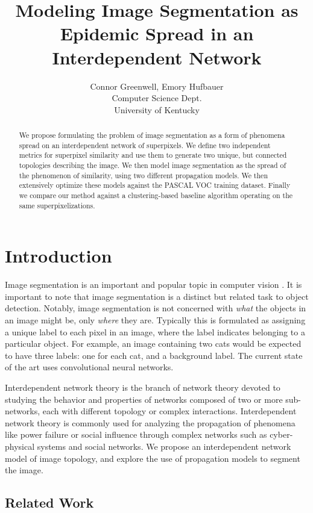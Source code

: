 \documentclass[twocolumn]{article}
\title{Modeling Image Segmentation as Epidemic Spread in an Interdependent Network}
\author{
  Connor Greenwell, Emory Hufbauer\\
  Computer Science Dept. \\
  University of Kentucky
}
\date{}
\newcommand{\seclab}[1]{\label{sec:#1}}
\begin{document}
\maketitle

\begin{abstract}
We propose formulating the problem of image segmentation as a form of phenomena spread on an interdependent network of superpixels. We define two independent metrics for superpixel similarity and use them to generate two unique, but connected topologies describing the image. We then model image segmentation as the spread of the phenomenon of similarity, using two different propagation models. We then extensively optimize these models against the PASCAL VOC training dataset. Finally we compare our method against a clustering-based baseline algorithm operating on the same superpixelizations.
\end{abstract}

\section{Introduction}

Image segmentation is an important and popular topic in computer vision \cite{newell2017associative, li2017fully, ren2017end}. It is important to note that image segmentation is a distinct but related task to object detection. Notably, image segmentation is not concerned with \emph{what} the objects in an image might be, only \emph{where} they are. Typically this is formulated as assigning a unique label to each pixel in an image, where the label indicates belonging to a particular object. For example, an image containing two cats would be expected to have three labels: one for each cat, and a background label. The current state of the art uses convolutional neural networks.

Interdependent network theory is the branch of network theory devoted to studying the behavior and properties of networks composed of two or more sub-networks, each with different topology or complex interactions. Interdependent network theory is commonly used for analyzing the propagation of phenomena like power failure or social influence through complex networks such as cyber-physical systems and social networks. We propose an interdependent network model of image topology, and explore the use of propagation models to segment the image. 

\subsection{Related Work}\seclab{related}
\end{document}
